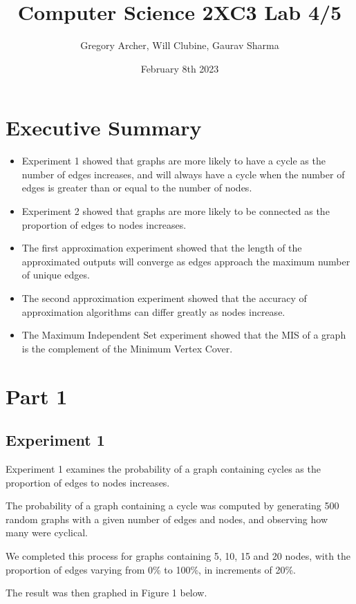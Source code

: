 \documentclass[titlepage]{article}
\title{Computer Science 2XC3 Lab 4/5}
\author{Gregory Archer, Will Clubine, Gaurav Sharma}
\date{February 8th 2023}
\begin{document}
\maketitle
\tableofcontents
\listoffigures

\newpage

\section{Executive Summary}
\begin{itemize}
    \item Experiment 1 showed that graphs are more likely to have a cycle as the number of edges increases, and will always have a cycle when the number of edges is greater than or equal to the number of nodes.
    \item Experiment 2 showed that graphs are more likely to be connected as the proportion of edges to nodes increases.
    \item The first approximation experiment showed that the length of the approximated outputs will converge as edges approach the maximum number of unique edges.
    \item The second approximation experiment showed that the accuracy of approximation algorithms can differ greatly as nodes increase.
    \item The Maximum Independent Set experiment showed that the MIS of a graph is the complement of the Minimum Vertex Cover.
\end{itemize}

\section{Part 1}

\subsection{Experiment 1}

Experiment 1 examines the probability of a graph containing cycles as the proportion of edges to nodes increases.

The probability of a graph containing a cycle was computed by generating 500 random graphs with a given number of edges and nodes, and observing how many were cyclical.

We completed this process for graphs containing 5, 10, 15 and 20 nodes, with the proportion of edges varying from 0\% to 100\%, in increments of 20\%.

The result was then graphed in Figure 1 below.
\end{document}
